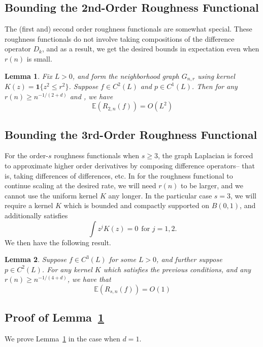 \documentclass{article}
\newcommand{\1}{\mathbf{1}}
\newcommand{\Ebb}{\mathbb{E}}
\theoremstyle{alden}
\theoremstyle{aldenthm}
\newtheorem{lemma}{Lemma}
\theoremstyle{definition}
\theoremstyle{remark}
\begin{document}
\subsection{Bounding the 2nd-Order Roughness Functional}
The (first and) second order roughness functionals are somewhat special. These roughness functionals do not involve taking compositions of the difference operator $D_k$, and as a result, we get the desired bounds in expectation even when $r(n)$ is small. 
\begin{lemma}
	\label{lem:2nd_order_roughness_functional}
	Fix $L > 0$, and form the neighborhood graph $G_{n,r}$ using kernel $K(z) = \1\{z^2 \leq r^2\}$. Suppose $f \in C^2(L)$ and $p \in C^1(L)$. Then for any $r(n) \geq n^{-1/(2+d)}$ and , we have
	\begin{equation*}
	\Ebb(R_{2,n}(f)) = O(L^2)
	\end{equation*}
\end{lemma}

\subsection{Bounding the 3rd-Order Roughness Functional}

For the order-$s$ roughness functionals when $s \geq 3$, the graph Laplacian is forced to approximate higher order derivatives by composing difference operators-- that is, taking differences of differences, etc. In for the roughness functional to continue scaling at the desired rate, we will need $r(n)$ to be larger, and we cannot use the uniform kernel $K$ any longer. In the particular case $s = 3$, we will require a kernel $K$ which is bounded and compactly supported on $B(0,1)$, and additionally satisfies
\begin{equation*}
\int z^j K(z) = 0~~\textrm{for $j = 1,2$.}
\end{equation*}
We then have the following result.
\begin{lemma}
	\label{lem:3rd_order_roughness_functional}
	Suppose $f \in C^{3}(L)$ for some $L > 0$, and further suppose $p \in C^{2}(L)$. For any kernel $K$ which satisfies the previous conditions, and any $r(n) \geq n^{-1/(4+d)}$, we have that
	\begin{equation*}
	\Ebb(R_{s,n}(f)) = O(1)
	\end{equation*} 
\end{lemma}

\subsection{Proof of Lemma~\ref{lem:2nd_order_roughness_functional}}
We prove Lemma~\ref{lem:2nd_order_roughness_functional} in the case when $d = 1$.
\end{document}
